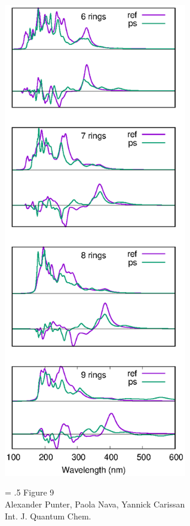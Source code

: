 \documentclass[12pt]{article}
\begin{document}
\begin{figure}

\begin{center}
\includegraphics[angle=-90,width=8cm]{helicene_uv_ecd.eps}
\end{center}
{\Large
\begin{minipage}[t]{3in}
\baselineskip = .5\baselineskip
Figure 9 \\
Alexander Punter, Paola Nava, Yannick Carissan\\
Int. J. Quantum Chem.
\end{minipage}
}
\end{figure}

\clearpage
\end{document}
